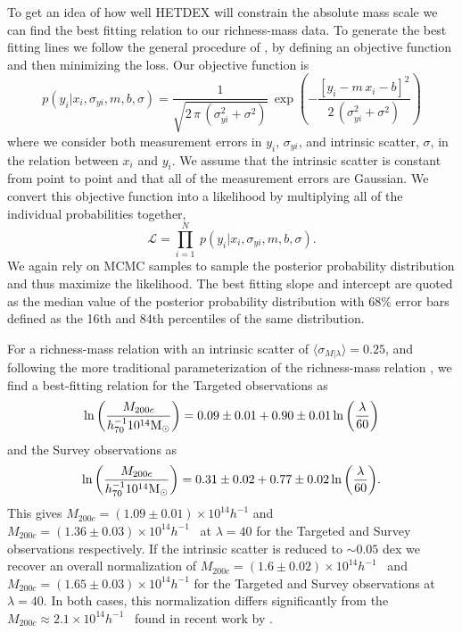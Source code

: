 \documentclass[fleqn,usenatbib]{mnras}
\begin{document}
To get an idea of how well HETDEX will constrain the absolute mass scale we can find the best fitting relation to our richness-mass data. To generate the best fitting lines we follow the general procedure of \cite{Hogg2010}, by defining an objective function and then minimizing the loss. Our objective function is
\begin{equation}\label{eq:objectivei}
p(y_i|x_i,\sigma_{yi},m,b,\sigma) = \frac{1}{\sqrt{2\,\pi\,(\sigma_{yi}^2+\sigma^2)}}
 \,\exp\left(-\frac{[y_i - m\,x_i - b]^2}{2\,(\sigma_{yi}^2+\sigma^2)}\right)
\end{equation}
where we consider both measurement errors in $y_i$, $\sigma_{yi}$, and intrinsic scatter, $\sigma$, in the relation between $x_i$ and $y_i$. We assume that the intrinsic scatter is constant from point to point and that all of the measurement errors are Gaussian. We convert this objective function into a likelihood by multiplying all of the individual probabilities together,  
\begin{equation}\label{eq:like}
\mathscr{L} = \prod_{i=1}^N \ p(y_i|x_i,\sigma_{yi},m,b, \sigma).
\end{equation}
We again rely on MCMC samples to sample the posterior probability distribution and thus maximize the likelihood. The best fitting slope and intercept are quoted as the median value of the posterior probability distribution with 68\% error bars defined as the 16th and 84th percentiles of the same distribution.

For a richness-mass relation with an intrinsic scatter of $\langle \sigma_{M|\lambda} \rangle = 0.25$, and following the more traditional parameterization of the richness-mass relation , we find a best-fitting relation for the Targeted observations as
\begin{equation}
	\ln\bigg{(}\frac{M_{200c}}{h_{70}^{-1} 10^{14}\hbox{$\mathrm{M}_\odot$}}\bigg{)} = 0.09\pm0.01 + 0.90\pm0.01 \ln\bigg{(}\frac{\lambda}{60}\bigg{)}
\end{equation}
and the Survey observations as
\begin{equation}
	\ln\bigg{(}\frac{M_{200c}}{h_{70}^{-1} 10^{14}\hbox{$\mathrm{M}_\odot$}}\bigg{)} = 0.31\pm0.02 + 0.77\pm0.02 \ln\bigg{(}\frac{\lambda}{60}\bigg{)}.
\end{equation}
This gives $M_{200c} = (1.09\pm0.01)\times10^{14} h^{-1}$ \Msol  and  $M_{200c} = (1.36\pm0.03)\times10^{14}h^{-1}$ \Msol\ at $\lambda=40$ for the Targeted and Survey observations respectively. If the intrinsic scatter is reduced to $\sim 0.05$ dex we recover an overall normalization of $M_{200c} = (1.6\pm0.02)\times10^{14} h^{-1}$ \Msol\ and $M_{200c} = (1.65\pm0.03)\times10^{14} h^{-1}$ for the Targeted and Survey observations at $\lambda=40$. In both cases, this normalization differs significantly from the $M_{200c} \approx 2.1\times10^{14} h^{-1}$ \Msol\ found in recent work by \cite{Li2016, Simet2016}.
\end{document}
